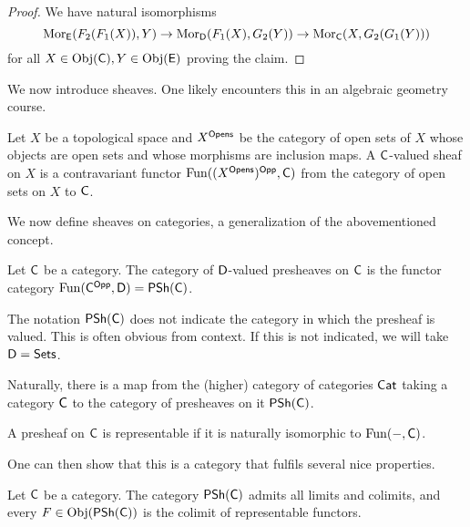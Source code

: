 \begin{proof}
  We have natural isomorphisms 
  $$\mathrm{Mor}_{\mathsf{E}}(F_{2}(F_{1}(X)),Y)\to\mathrm{Mor}_{\mathsf{D}}(F_{1}(X),G_{2}(Y))\to\mathrm{Mor}_{\mathsf{C}}(X,G_{2}(G_{1}(Y)))$$
  for all $X\in\mathrm{Obj}(\mathsf{C}),Y\in\mathrm{Obj}(\mathsf{E})$ proving the claim. 
\end{proof}
We now introduce sheaves. One likely encounters this in an algebraic geometry course. 
\begin{example}
  Let $X$ be a topological space and $X^{\mathsf{Opens}}$ be the category of open sets of $X$ whose objects are open sets and whose morphisms are inclusion maps. A $\mathsf{C}$-valued sheaf on $X$ is a contravariant functor $\mathrm{Fun}((X^{\mathsf{Opens}})^{\mathsf{Opp}},\mathsf{C})$ from the category of open sets on $X$ to $\mathsf{C}$. 
\end{example}
We now define sheaves on categories, a generalization of the abovementioned concept. 
\begin{definition}
  Let $\mathsf{C}$ be a category. The category of $\mathsf{D}$-valued presheaves on $\mathsf{C}$ is the functor category $\mathrm{Fun}(\mathsf{C}^{\mathsf{Opp}},\mathsf{D})=\mathsf{PSh}(\mathsf{C})$. 
\end{definition}
\begin{remark}
  The notation $\mathsf{PSh}(\mathsf{C})$ does not indicate the category in which the presheaf is valued. This is often obvious from context. If this is not indicated, we will take $\mathsf{D}=\mathsf{Sets}$. 
\end{remark}
Naturally, there is a map from the (higher) category of categories $\mathsf{Cat}$ taking a category $\mathsf{C}$ to the category of presheaves on it $\mathsf{PSh}(\mathsf{C})$. 
\begin{definition}
  A presheaf on $\mathsf{C}$ is representable if it is naturally isomorphic to $\mathrm{Fun}(-,\mathsf{C})$.
\end{definition}
One can then show that this is a category that fulfils several nice properties. 
\begin{theorem}
  Let $\mathsf{C}$ be a category. The category $\mathsf{PSh}(\mathsf{C})$ admits all limits and colimits, and every $F\in\mathrm{Obj}(\mathsf{PSh}(\mathsf{C}))$ is the colimit of representable functors. 
\end{theorem}